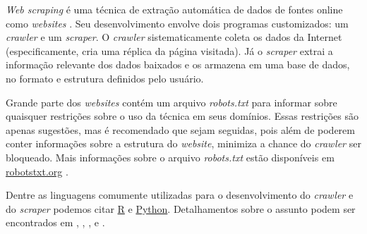 \documentclass{automatextcc}
\begin{document}

\textit{Web scraping} é uma técnica de extração automática de dados de fontes online como \textit{websites} \citep{farley2017,khder2021}. Seu desenvolvimento envolve dois programas customizados: um \textit{crawler} e um \textit{scraper}. O \textit{crawler} sistematicamente coleta os dados da Internet (especificamente, cria uma réplica da página visitada). Já o \textit{scraper} extrai a informação relevante dos dados baixados e os armazena em uma base de dados, no formato e estrutura definidos pelo usuário. \citep{lawson2015,patil2016}

Grande parte dos \textit{websites} contém um arquivo \textit{robots.txt} para informar sobre quaisquer restrições sobre o uso da técnica em seus domínios. Essas restrições são apenas sugestões, mas é recomendado que sejam seguidas, pois além de poderem conter informações sobre a estrutura do \textit{website}, minimiza a chance do \textit{crawler} ser bloqueado. Mais informações sobre o arquivo \textit{robots.txt} estão disponíveis em \url{robotstxt.org} \citep{lawson2015}.

Dentre as linguagens comumente utilizadas para o desenvolvimento do \textit{crawler} e do \textit{scraper} podemos citar \href{https://cran.r-project.org}{R} e \href{https://python.org/}{Python}. Detalhamentos sobre o assunto podem ser encontrados em \citet{lawson2015}, \citet{sirisuriya2015}, \citet{patil2016}, \citet{farley2017} e \citet{khder2021}.



\end{document}
